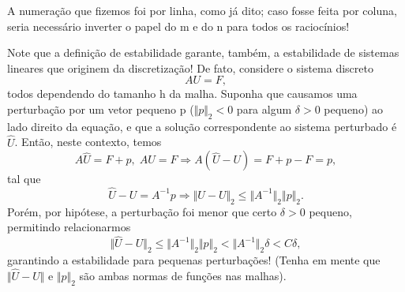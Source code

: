 \documentclass[../differential_methods.tex]{subfiles}
\begin{document}
\begin{tcolorbox}[
		skin=enhanced,
		title=Observação,
		fonttitle=\bfseries,
		colframe=black,
		colbacktitle=cyan!75!white,
		colback=cyan!15,
		colbacklower=black,
		coltitle=black,
		drop fuzzy shadow,
	]
	A numeração que fizemos foi por linha, como já dito; caso fosse feita por coluna, seria necessário inverter o papel do m e do n para todos os raciocínios!
\end{tcolorbox}

Note que a definição de estabilidade garante, também, a estabilidade de sistemas lineares que originem da discretização! De fato, considere o sistema discreto
\[
	AU = F,
\]
todos dependendo do tamanho h da malha. Suponha que causamos uma perturbação por um vetor pequeno p (\(\Vert p \Vert_{2}<0\) para algum \( \delta >0\) pequeno) ao lado direito da equação, e que a solução correspondente ao sistema perturbado é \(\hat{U}\). Então, neste contexto, temos
\[
	A\hat{U} = F +p,\; A U = F \Rightarrow A(\hat{U}-U)=F+p-F = p,
\]
tal que
\[
	\hat{U}-U=A^{-1}p \Rightarrow \Vert \hat{U}-U \Vert_{2}\leq \Vert A^{-1} \Vert_{2}\Vert p \Vert_{2}.
\]
Porém, por hipótese, a perturbação foi menor que certo \(\delta > 0\) pequeno, permitindo relacionarmos
\[
	\Vert \hat{U}-U \Vert_{2}\leq \Vert A^{-1} \Vert_{2}\Vert p \Vert_{2}<\Vert A^{-1} \Vert_{2}\delta <C\delta ,
\]
garantindo a estabilidade para pequenas perturbações! (Tenha em mente que \(\Vert \hat{U}-U \Vert\) e \(\Vert p \Vert_{2}\) são ambas normas de funções nas malhas).
\end{document}
